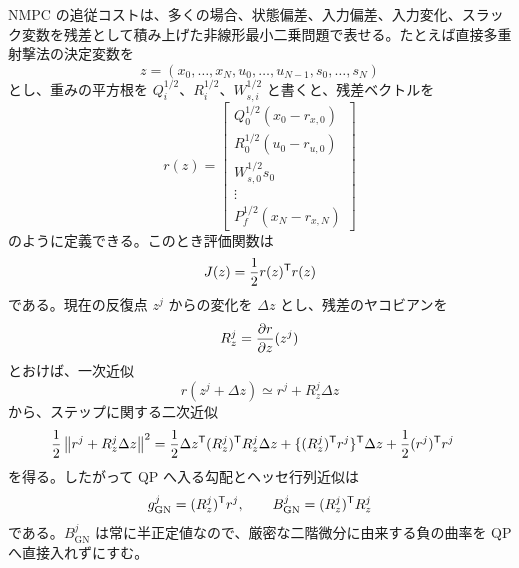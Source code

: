 NMPC の追従コストは、多くの場合、状態偏差、入力偏差、入力変化、スラック変数を残差として積み上げた非線形最小二乗問題で表せる。たとえば直接多重射撃法の決定変数を
\begin{equation}
  z=
  (x_0,\ldots,x_N,u_0,\ldots,u_{N-1},s_0,\ldots,s_N)
\end{equation}
とし、重みの平方根を $Q_i^{1/2}$、$R_i^{1/2}$、$W_{s,i}^{1/2}$ と書くと、残差ベクトルを
\begin{equation}
  r(z)=
  \begin{bmatrix}
    Q_0^{1/2}(x_0-r_{x,0})\\
    R_0^{1/2}(u_0-r_{u,0})\\
    W_{s,0}^{1/2}s_0\\
    \vdots\\
    P_f^{1/2}(x_N-r_{x,N})
  \end{bmatrix}
\end{equation}
のように定義できる。このとき評価関数は
\begin{equation}
  J(z)=\frac{1}{2}r(z)^{\mathsf{T}} r(z)
\end{equation}
である。現在の反復点 $z^j$ からの変化を $\Delta z$ とし、残差のヤコビアンを
\begin{equation}
  R_z^j=\frac{\partial r}{\partial z}(z^j)
\end{equation}
とおけば、一次近似
\begin{equation}
  r(z^j+\Delta z)\simeq r^j+R_z^j\Delta z
\end{equation}
から、ステップに関する二次近似
\begin{align}
  \frac{1}{2}\left\|r^j+R_z^j\Delta z\right\|^{2}
  &=
  \frac{1}{2}\Delta z^{\mathsf{T}} (R_z^j)^{\mathsf{T}} R_z^j\Delta z
  +\{(R_z^j)^{\mathsf{T}} r^j\}^{\mathsf{T}}\Delta z
  +\frac{1}{2}(r^j)^{\mathsf{T}} r^j
\end{align}
を得る。したがって QP へ入る勾配とヘッセ行列近似は
\begin{equation}
  g_{\mathrm{GN}}^j=(R_z^j)^{\mathsf{T}} r^j,
  \qquad
  B_{\mathrm{GN}}^j=(R_z^j)^{\mathsf{T}} R_z^j
\end{equation}
である。$B_{\mathrm{GN}}^j$ は常に半正定値なので、厳密な二階微分に由来する負の曲率を QP へ直接入れずにすむ。

